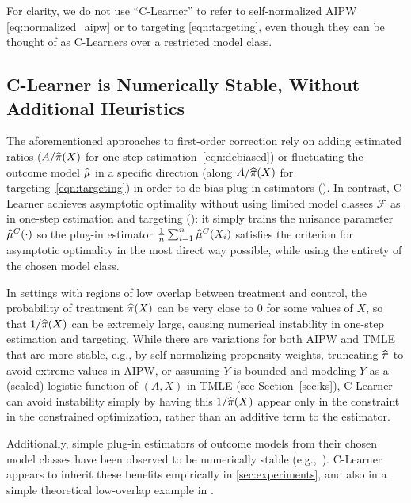  For clarity, we do not use ``C-Learner'' to refer %
to self-normalized AIPW \eqref{eq:normalized_aipw} or to targeting \eqref{eqn:targeting}, even though they can be thought of as C-Learners over a restricted model class. %

\subsection{C-Learner is Numerically Stable, Without Additional Heuristics}
\label{sec:c_learner_stable_comparison}
 The aforementioned approaches to first-order correction rely on adding estimated ratios 
($A/\widehat{\pi}(X)$ for one-step estimation~\eqref{eqn:debiased})
or fluctuating the outcome model $\widehat{\mu}$ in a specific direction (along $A/\widehat{\pi}(X)$ for targeting~\eqref{eqn:targeting})
in order to de-bias plug-in estimators ().
In contrast, C-Learner achieves asymptotic optimality without using limited model classes $\mathcal F$ %
as in one-step estimation and targeting (): it simply trains the nuisance parameter $\widehat{\mu}^C(\cdot)$ so the plug-in estimator $\frac{1}{n}\sum_{i=1}^n \widehat{\mu}^C(X_i)$ satisfies the criterion for asymptotic optimality in the most direct way possible, while using the entirety of the chosen model class. 


 In settings with regions of low overlap between treatment and control, the probability of treatment $\widehat{\pi}(X)$ can be very close to 0 for some values of $X$, so that $1/\widehat{\pi}(X)$ can be extremely large, causing numerical instability in one-step estimation and targeting. 
While there are variations for both AIPW and TMLE that are more stable, e.g., by self-normalizing propensity weights, truncating $\widehat{\pi}$ to avoid extreme values in AIPW, or assuming $Y$ is bounded and modeling $Y$ as a (scaled) logistic function of $(A,X)$
in TMLE (see Section~\ref{sec:ks}), 
C-Learner can avoid instability simply by having this $1/\widehat{\pi}(X)$ appear only in the constraint in the constrained optimization, rather than an additive term to the estimator. 


Additionally, simple plug-in estimators of outcome models from their chosen model classes 
have been observed to be numerically stable (e.g.,~\cite{KangSc07}). 
C-Learner appears to inherit these benefits empirically in \cref{sec:experiments}, and also in a simple theoretical low-overlap example in . 



 














